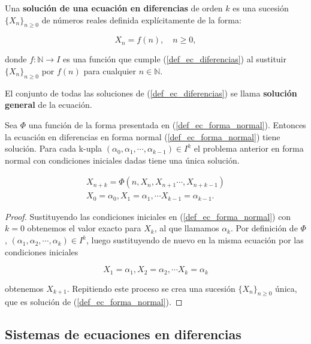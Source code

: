 \begin{definition}
Una \textbf{solución de una ecuación en diferencias} de orden $k$ es una sucesión $\{X_n\}_{n\geq 0}$ de números reales definida explícitamente de la forma:

$$X_n = f(n),\quad n\geq 0,$$

donde $f: \mathbb{N} \rightarrow I$ es una función que cumple (\ref{def_ec_diferencias}) al sustituir $\{X_n\}_{n\geq 0}$ por $f(n)$ para cualquier $n\in\mathbb{N}$.

El conjunto de todas las soluciones de (\ref{def_ec_diferencias}) se llama \textbf{solución general} de la ecuación.
\end{definition}

\begin{theorem}
Sea $\Phi$ una función de la forma presentada en (\ref{def_ec_forma_normal}). Entonces la ecuación en diferencias en forma normal (\ref{def_ec_forma_normal}) tiene solución.
Para cada k-upla $(\alpha_0, \alpha_1, \cdots ,\alpha_{k-1})\in I^{k}$ el problema anterior en forma normal con condiciones iniciales dadas tiene una única solución.

\begin{equation}
\begin{aligned}
X_{n+k} = \Phi (n, X_n, X_{n+1}\cdots , X_{n+k-1}) \\
X_0 = \alpha_0, X_1=\alpha_1, \cdots X_{k-1}=\alpha_{k-1}.
\end {aligned}
\end{equation}

\end{theorem}
\begin{proof}
Sustituyendo las condiciones iniciales en (\ref{def_ec_forma_normal}) con $k=0$ obtenemos el valor exacto para $X_k$, al que llamamos $\alpha_k$. Por definición de $\Phi$, $(\alpha_1, \alpha_2, \cdots ,\alpha_{k})\in I^{k}$, luego sustituyendo de nuevo en la misma ecuación por las condiciones iniciales

$$X_1 = \alpha_1, X_2=\alpha_2, \cdots X_{k}=\alpha_{k}$$

obtenemos $X_{k+1}$. Repitiendo este proceso se crea una sucesión $\{X_n\}_{n\geq 0}$ única, que es solución de (\ref{def_ec_forma_normal}).
\end{proof}


\subsection{Sistemas de ecuaciones en diferencias}

